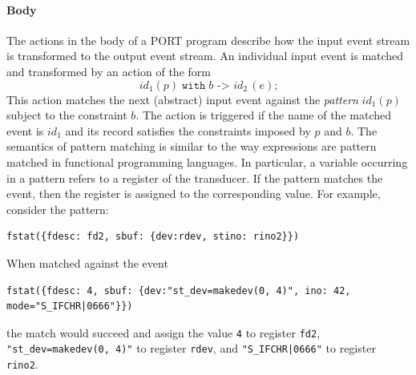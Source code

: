 %
%



\paragraph*{Body}
The actions in the body of a PORT program describe how the input event stream is transformed to the output event stream. An individual input event is matched and transformed by an action of the form
\[\mathit{id}_1(p) \;\mathtt{with}\; b \texttt{ -> } \mathit{id}_2\,(e)\texttt{;}\]
This action matches the next (abstract) input event against the \emph{pattern} $\mathit{id}_1(p)$ subject to the constraint $b$. The action is triggered if the name of the matched event is $\mathit{id}_1$ and its record satisfies the constraints imposed by $p$ and $b$. The semantics of pattern matching is similar to the way  expressions are pattern matched in functional programming languages. In particular, a variable occurring in a pattern refers to a register of the transducer. If the pattern matches the event, then the register is assigned to the corresponding value. For example, consider the pattern:
\begin{lstlisting}[numbers=none,xleftmargin=0em,gobble=2]
  fstat({fdesc: fd2, sbuf: {dev:rdev, stino: rino2}})
\end{lstlisting}
When matched against the event
\begin{lstlisting}[numbers=none,xleftmargin=0em,gobble=2]
  fstat({fdesc: 4, sbuf: {dev:"st_dev=makedev(0, 4)", ino: 42, mode="S_IFCHR|0666"}})
\end{lstlisting}
the match would succeed and assign the value \lstinline+4+ to register \lstinline+fd2+, \lstinline+"st_dev=makedev(0, 4)"+ to register \lstinline+rdev+, and \lstinline+"S_IFCHR|0666"+ to register \lstinline+rino2+.

